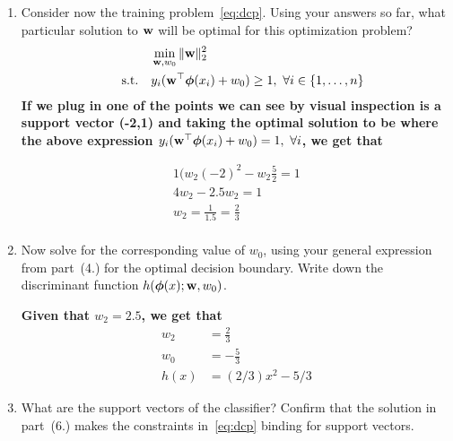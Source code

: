 \documentclass[submit]{harvardml}
\newenvironment{answer}{%
    \color{answergreen}\bf}
  {%
  }
\begin{document}
\begin{enumerate}
        \item Consider now the training problem~\eqref{eq:dcp}. Using your answers so far, what
            particular solution to $\mathbf{w}$ will be optimal for this optimization problem?
\begin{answer}
             \begin{align*}
                 &\min_{\mathbf{w}, w_0} \|\mathbf{w}\|_2^2 \label{eq:dcp} \\
                 \quad \text{s.t.} \quad & y_i(\mathbf{w}^\top \boldsymbol{\phi}(x_i) + w_0) \geq 1,~\forall i \in \{1,\ldots, n\}
             \end{align*}
             If we plug in one of the points we can see by visual inspection is a support vector
             (-2,1) and taking the optimal
             solution to be where the above expression $ y_i(\mathbf{w}^\top \boldsymbol{\phi}(x_i) + w_0) =
             1,~\forall i  $, we get that 

             \begin{align*}
                 1 (w_2(-2)^2 - w_2 \frac{5}{2} = 1 \\
                 4 w_2 - 2.5w_2 =1  \\
                 w_2 = \frac{1}{1.5} = \frac{2}{3} \\
             \end{align*}

    \end{answer}

        \item Now solve for the corresponding value of $w_0$, using your general expression from
            part~(4.) for the optimal decision boundary.  Write down the discriminant function
            $h(\boldsymbol{\phi}(x);\mathbf{w},w_0)$.

            \begin{answer}
                Given that $w_2 = 2.5$, we get that
                \begin{align*}
                    w_2 &= \frac{2}{3} \\
                    w_0 &= -\frac{5}{3} \\
                    h(x) &= (2/3) x^2 - 5/3
                \end{align*}
            \end{answer}

        \item What are the support vectors of the classifier?  Confirm that the solution in part~(6.)
            makes the constraints in~\eqref{eq:dcp} binding for support vectors.
\begin{answer} 
    

\end{answer}
\end{enumerate}
\end{document}
